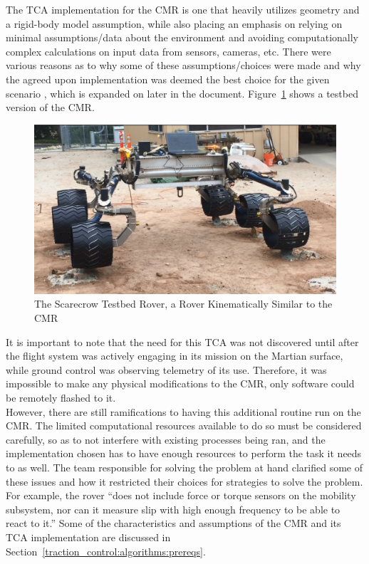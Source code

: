 The \ac{TCA} implementation for the \ac{CMR} is one that heavily utilizes geometry and a rigid-body model assumption, while also placing an emphasis on relying on minimal assumptions/data about the environment and avoiding computationally complex calculations on input data from sensors, cameras, etc. There were various reasons as to why some of these assumptions/choices were made and why the agreed upon implementation was deemed the best choice for the given scenario \cite{tractl}, which is expanded on later in the document. Figure~\ref{traction_control:algorithms:scarecrow} shows a testbed version of the \ac{CMR}.

\begin{figure}[htbp]
	\centering
	\includegraphics[width=.9\textwidth]{sections/introduction/images/scarecrow_testbed.png}
	\caption{The Scarecrow Testbed Rover, a Rover Kinematically Similar to the \acl{CMR} \cite{tractl}}
	\label{traction_control:algorithms:scarecrow}
\end{figure}

It is important to note that the need for this \ac{TCA} was not discovered until after the flight system was actively engaging in its mission on the Martian surface, while ground control was observing telemetry of its use. Therefore, it was impossible to make any physical modifications to the \ac{CMR}, only software could be remotely flashed to it. \\

However, there are still ramifications to having this additional routine run on the \ac{CMR}. The limited computational resources available to do so must be considered carefully, so as to not interfere with existing processes being ran, and the implementation chosen has to have enough resources to perform the task it needs to as well. The team responsible for solving the problem at hand clarified some of these issues and how it restricted their choices for strategies to solve the problem. For example, the rover ``does not include force or torque sensors on the mobility subsystem, nor can it measure slip with high enough frequency to be able to react to it.'' \cite{tractl} Some of the characteristics and assumptions of the \ac{CMR} and its \ac{TCA} implementation are discussed in Section~\ref{traction_control:algorithms:prereqs}. \\

